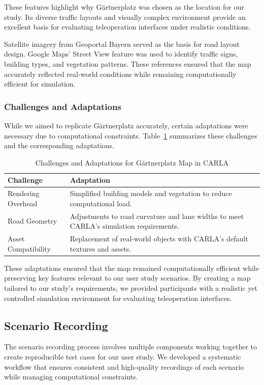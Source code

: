 These features highlight why Gärtnerplatz was chosen as the location for our study. Its diverse traffic layouts and visually complex environment provide an excellent basis for evaluating teleoperation interfaces under realistic conditions.

Satellite imagery from Geoportal Bayern \cite{geoportal_bayern} served as the basis for road layout design. Google Maps' Street View feature was used to identify traffic signs, building types, and vegetation patterns. These references ensured that the map accurately reflected real-world conditions while remaining computationally efficient for simulation.

\subsubsection*{Challenges and Adaptations}
While we aimed to replicate Gärtnerplatz accurately, certain adaptations were necessary due to computational constraints. Table~\ref{table:challenges_adaptations} summarizes these challenges and the corresponding adaptations.

\begin{table}[h!]
\centering
\begin{tabular}{@{}p{4cm}p{10cm}@{}}
\toprule
\textbf{Challenge} & \textbf{Adaptation} \\
\midrule
Rendering Overhead & Simplified building models and vegetation to reduce computational load. \\
\midrule
Road Geometry & Adjustments to road curvature and lane widths to meet CARLA's simulation requirements. \\
\midrule
Asset Compatibility & Replacement of real-world objects with CARLA's default textures and assets. \\
\bottomrule
\end{tabular}
\caption{Challenges and Adaptations for Gärtnerplatz Map in CARLA}
\label{table:challenges_adaptations}
\end{table}

These adaptations ensured that the map remained computationally efficient while preserving key features relevant to our user study scenarios. By creating a map tailored to our study's requirements, we provided participants with a realistic yet controlled simulation environment for evaluating teleoperation interfaces.
\subsection{Scenario Recording}
The scenario recording process involves multiple components working together to create reproducible test cases for our user study. We developed a systematic workflow that ensures consistent and high-quality recordings of each scenario while managing computational constraints.

